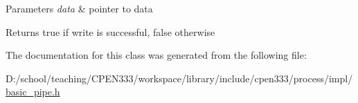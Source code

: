 \begin{DoxyParams}{Parameters}
{\em data} & pointer to data \\
\hline
\end{DoxyParams}
\begin{DoxyReturn}{Returns}
true if write is successful, false otherwise 
\end{DoxyReturn}


The documentation for this class was generated from the following file\+:\begin{DoxyCompactItemize}
\item 
D\+:/school/teaching/\+C\+P\+E\+N333/workspace/library/include/cpen333/process/impl/\hyperlink{basic__pipe_8h}{basic\+\_\+pipe.\+h}\end{DoxyCompactItemize}
